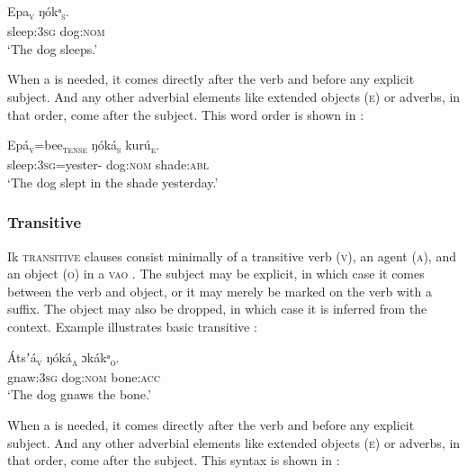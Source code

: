 \ea\label{ex:syn:11}
\gll Epa\textsc{\textsubscript{v}}\textsc{}    ŋókᵃ\textsc{\textsubscript{s}}. \\
sleep:\textsc{3sg}   dog:\textsc{nom}    \\
\glt ‘The dog sleeps.’ 
\z


When a   is needed, it comes directly after the verb and before any explicit subject. And any other adverbial elements like extended objects (\textsc{e}) or adverbs, in that order, come after the subject. This word order is shown in :



\ea\label{ex:syn:12}
\gll Epá\textsc{\textsubscript{v}}=bee\textsc{\textsubscript{tense}}   ŋóká\textsc{\textsubscript{s}}     kurú\textsc{\textsubscript{e}}. \\
sleep:\textsc{3sg}=yester-   dog:\textsc{nom}   shade:\textsc{abl}    \\
\glt ‘The dog slept in the shade yesterday.’ 
\z




\subsubsection{Transitive}\label{sec:10.2.2}

Ik \textsc{transitive} clauses consist minimally of a transitive verb (\textsc{v}), an agent (\textsc{a}), and an object (\textsc{o}) in a \textsc{vao} . The subject may be explicit, in which case it comes between the verb and object, or it may merely be marked on the verb with a suffix. The object may also be dropped, in which case it is inferred from the context. Example  illustrates basic transitive :




\ea\label{ex:syn:13}
\gll Átsʼá\textsc{\textsubscript{v}}    ŋóká\textsc{\textsubscript{a}}    ɔkákᵃ\textsc{\textsubscript{o}}\textsc{.} \\
gnaw:\textsc{3sg}  dog:\textsc{nom}  bone:\textsc{acc}    \\
\glt ‘The dog gnaws the bone.’ 
\z


When a   is needed, it comes directly after the verb and before any explicit subject. And any other adverbial elements like extended objects (\textsc{e}) or adverbs, in that order, come after the subject. This syntax is shown in :



